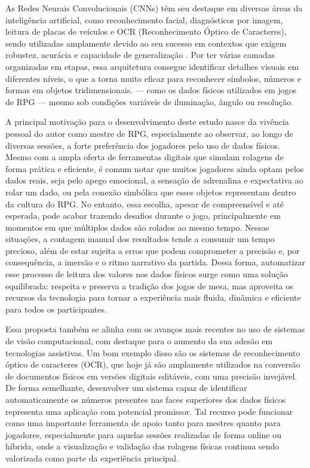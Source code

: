 As Redes Neurais Convolucionais (CNNs) têm seu destaque em diversas áreas da inteligência artificial, como 
reconhecimento facial, diagnósticos por imagem, leitura de placas de veículos e OCR (Reconhecimento Óptico 
de Caracteres), sendo utilizadas amplamente devido ao seu sucesso em contextos que exigem robustez, 
acurácia e capacidade de generalização \cite{lecun1998gradient, goodfellow2016deep}. Por ter várias camadas 
organizadas em etapas, essa arquitetura consegue identificar detalhes visuais em diferentes níveis, o que a 
torna muito eficaz para reconhecer símbolos, números e formas em objetos tridimensionais. — como os dados 
físicos utilizados em jogos de RPG — mesmo sob condições variáveis de iluminação, ângulo ou resolução.

A principal motivação para o desenvolvimento deste estudo nasce da vivência pessoal do autor como mestre de RPG, 
especialmente ao observar, ao longo de diversas sessões, a forte preferência dos jogadores pelo uso de dados 
físicos. Mesmo com a ampla oferta de ferramentas digitais que simulam rolagens de forma prática e eficiente, 
é comum notar que muitos jogadores ainda optam pelos dados reais, seja pelo apego emocional, a sensação de adrenalina
e expectativa ao rolar um dado, ou pela conexão simbólica que esses objetos representam dentro da cultura do RPG.
No entanto, essa escolha, apesar de compreensível e até esperada, pode acabar trazendo desafios durante o jogo, 
principalmente em momentos em que múltiplos dados são rolados ao mesmo tempo. Nessas situações, a contagem 
manual dos resultados tende a consumir um tempo precioso, além de estar sujeita a erros que podem comprometer 
a precisão e, por consequência, a imersão e o ritmo narrativo da partida. Dessa forma, automatizar esse 
processo de leitura dos valores nos dados físicos surge como uma solução equilibrada: respeita e preserva a 
tradição dos jogos de mesa, mas aproveita os recursos da tecnologia para tornar a experiência mais fluida, 
dinâmica e eficiente para todos os participantes.

Essa proposta também se alinha com os avanços mais recentes no uso de sistemas de visão computacional, com 
destaque para o aumento da sua adesão em tecnologias assistivas. Um bom exemplo disso são os sistemas 
de reconhecimento óptico de caracteres (OCR), que hoje já são amplamente utilizados na conversão de documentos 
físicos em versões digitais editáveis, com uma precisão invejável. De forma semelhante, desenvolver um sistema 
capaz de identificar automaticamente os números presentes nas faces superiores dos dados físicos representa uma 
aplicação com potencial promissor. Tal recurso pode funcionar como uma importante ferramenta de apoio tanto para
mestres quanto para jogadores, especialmente para aquelas sessões realizadas de forma online ou híbrida, onde
a visualização e validação das rolagens físicas continua sendo valorizada como parte da experiência principal.

